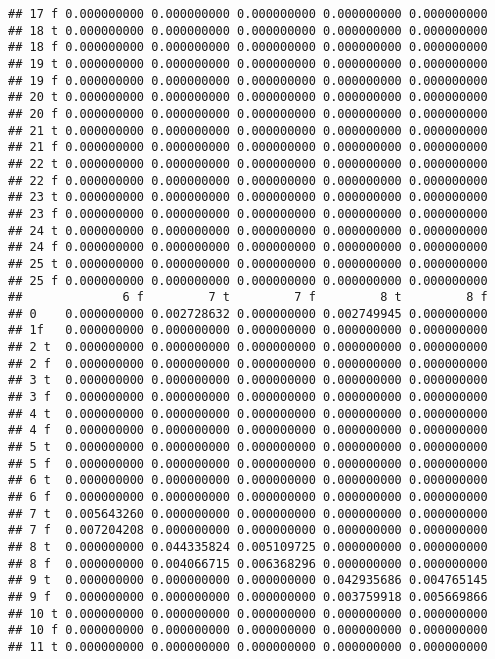 \documentclass[]{article}
\begin{document}
\begin{verbatim}
## 17 f 0.000000000 0.000000000 0.000000000 0.000000000 0.000000000
## 18 t 0.000000000 0.000000000 0.000000000 0.000000000 0.000000000
## 18 f 0.000000000 0.000000000 0.000000000 0.000000000 0.000000000
## 19 t 0.000000000 0.000000000 0.000000000 0.000000000 0.000000000
## 19 f 0.000000000 0.000000000 0.000000000 0.000000000 0.000000000
## 20 t 0.000000000 0.000000000 0.000000000 0.000000000 0.000000000
## 20 f 0.000000000 0.000000000 0.000000000 0.000000000 0.000000000
## 21 t 0.000000000 0.000000000 0.000000000 0.000000000 0.000000000
## 21 f 0.000000000 0.000000000 0.000000000 0.000000000 0.000000000
## 22 t 0.000000000 0.000000000 0.000000000 0.000000000 0.000000000
## 22 f 0.000000000 0.000000000 0.000000000 0.000000000 0.000000000
## 23 t 0.000000000 0.000000000 0.000000000 0.000000000 0.000000000
## 23 f 0.000000000 0.000000000 0.000000000 0.000000000 0.000000000
## 24 t 0.000000000 0.000000000 0.000000000 0.000000000 0.000000000
## 24 f 0.000000000 0.000000000 0.000000000 0.000000000 0.000000000
## 25 t 0.000000000 0.000000000 0.000000000 0.000000000 0.000000000
## 25 f 0.000000000 0.000000000 0.000000000 0.000000000 0.000000000
##              6 f         7 t         7 f         8 t         8 f
## 0    0.000000000 0.002728632 0.000000000 0.002749945 0.000000000
## 1f   0.000000000 0.000000000 0.000000000 0.000000000 0.000000000
## 2 t  0.000000000 0.000000000 0.000000000 0.000000000 0.000000000
## 2 f  0.000000000 0.000000000 0.000000000 0.000000000 0.000000000
## 3 t  0.000000000 0.000000000 0.000000000 0.000000000 0.000000000
## 3 f  0.000000000 0.000000000 0.000000000 0.000000000 0.000000000
## 4 t  0.000000000 0.000000000 0.000000000 0.000000000 0.000000000
## 4 f  0.000000000 0.000000000 0.000000000 0.000000000 0.000000000
## 5 t  0.000000000 0.000000000 0.000000000 0.000000000 0.000000000
## 5 f  0.000000000 0.000000000 0.000000000 0.000000000 0.000000000
## 6 t  0.000000000 0.000000000 0.000000000 0.000000000 0.000000000
## 6 f  0.000000000 0.000000000 0.000000000 0.000000000 0.000000000
## 7 t  0.005643260 0.000000000 0.000000000 0.000000000 0.000000000
## 7 f  0.007204208 0.000000000 0.000000000 0.000000000 0.000000000
## 8 t  0.000000000 0.044335824 0.005109725 0.000000000 0.000000000
## 8 f  0.000000000 0.004066715 0.006368296 0.000000000 0.000000000
## 9 t  0.000000000 0.000000000 0.000000000 0.042935686 0.004765145
## 9 f  0.000000000 0.000000000 0.000000000 0.003759918 0.005669866
## 10 t 0.000000000 0.000000000 0.000000000 0.000000000 0.000000000
## 10 f 0.000000000 0.000000000 0.000000000 0.000000000 0.000000000
## 11 t 0.000000000 0.000000000 0.000000000 0.000000000 0.000000000

\end{verbatim}
\end{document}
